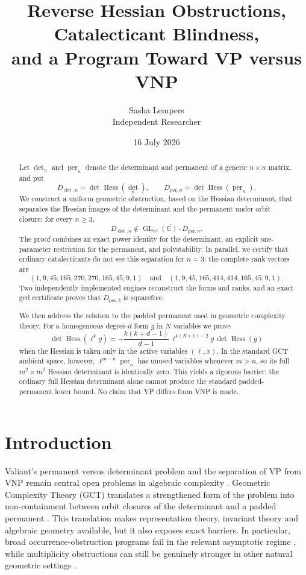 \documentclass[11pt]{article}
\title{Reverse Hessian Obstructions, Catalecticant Blindness,\\and a Program Toward VP versus VNP}
\author{Sasha Lempers\\\small Independent Researcher}
\date{16 July 2026}
\theoremstyle{definition}
\theoremstyle{remark}
\DeclareMathOperator{\Hess}{Hess}
\DeclareMathOperator{\per}{per}
\newcommand{\C}{\mathbb C}
\newcommand{\GL}{\operatorname{GL}}
\begin{document}
\maketitle

\begin{abstract}
Let $\det_n$ and $\per_n$ denote the determinant and permanent of a generic
$n\times n$ matrix, and put
\[
 D_{\det,n}=\det\Hess(\det_n),\qquad
 D_{\mathrm{per},n}=\det\Hess(\per_n).
\]
We construct a uniform geometric obstruction, based on the Hessian determinant,
that separates the Hessian images of the determinant and the permanent under
orbit closure: for every $n\geq3$,
\[
 D_{\det,n}\notin\overline{\GL_{n^2}(\C)\cdot D_{\mathrm{per},n}}.
\]
The proof combines an exact power identity for the determinant, an explicit
one-parameter restriction for the permanent, and polystability.  In parallel,
we certify that ordinary catalecticants do not see this separation for $n=3$:
the complete rank vectors are
\[
(1,9,45,165,270,270,165,45,9,1)
\quad\text{and}\quad
(1,9,45,165,414,414,165,45,9,1).
\]
Two independently implemented engines reconstruct the forms and ranks, and an
exact gcd certificate proves that $D_{\mathrm{per},3}$ is squarefree.

We then address the relation to the padded permanent used in geometric
complexity theory.  For a homogeneous degree-$d$ form $g$ in $N$ variables we
prove
\[
\det\Hess(\ell^k g)
=-\frac{k(k+d-1)}{d-1}\,
 \ell^{k(N+1)-2}g\,\det\Hess(g)
\]
when the Hessian is taken only in the active variables $(\ell,x)$.  In the
standard GCT ambient space, however, $\ell^{m-n}\per_n$ has unused variables
whenever $m>n$, so its full $m^2\times m^2$ Hessian determinant is identically
zero.  This yields a rigorous barrier: the ordinary full Hessian determinant
alone cannot produce the standard padded-permanent lower bound.  No claim that
VP differs from VNP is made.
\end{abstract}

\section{Introduction}

Valiant's permanent versus determinant problem and the separation of VP from
VNP remain central open problems in algebraic complexity
\cite{Valiant1979,BLMW2011}.  Geometric Complexity Theory (GCT) translates a
strengthened form of the problem into non-containment between orbit closures of
the determinant and a padded permanent
\cite{MulmuleySohoni2001,MulmuleySohoni2008}.  This translation makes
representation theory, invariant theory and algebraic geometry available, but
it also exposes exact barriers.  In particular, broad occurrence-obstruction
programs fail in the relevant asymptotic regime
\cite{IP2017,BIP2019}, while multiplicity obstructions can still be genuinely
stronger in other natural geometric settings \cite{DIP2020}.
\end{document}
